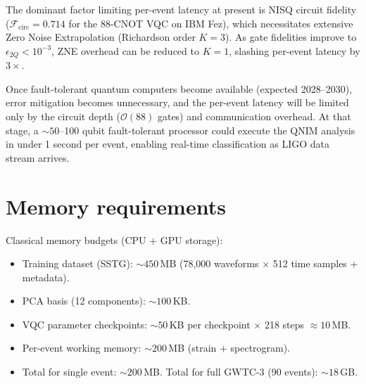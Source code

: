 \documentclass[11pt,a4paper, english]{book}
\theoremstyle{plain}
\theoremstyle{definition}
\numberwithin{equation}{chapter}
\numberwithin{figure}{chapter}
\numberwithin{table}{chapter}
\begin{document}
\begin{table}[ht]
\centering
\small
{}
\caption[Projected QNIM latencies for future hardware]{Projected latencies for QNIM pipeline at future hardware generations. Source: own elaboration.}
\label{tab:scalability-roadmap}
\normalsize
\end{table}

The dominant factor limiting per-event latency at present is NISQ circuit fidelity 
($\mathcal{F}_\mathrm{circ} = 0.714$ for the 88-CNOT VQC on IBM Fez), which 
necessitates extensive Zero Noise Extrapolation (Richardson order $K = 3$). 
As gate fidelities improve to $\epsilon_{2Q} < 10^{-3}$, ZNE overhead can be 
reduced to $K = 1$, slashing per-event latency by $3\times$.

Once fault-tolerant quantum computers become available (expected 2028--2030), 
error mitigation becomes unnecessary, and the per-event latency will be limited 
only by the circuit depth ($\mathcal{O}(88)$ gates) and communication overhead. 
At that stage, a $\sim 50$--100 qubit fault-tolerant processor could execute the 
QNIM analysis in under 1 second per event, enabling real-time classification 
as LIGO data stream arrives.

\section{Memory requirements}

Classical memory budgets (CPU + GPU storage):
\begin{itemize}
  \item Training dataset (SSTG): $\sim 450$\,MB (78,000 waveforms $\times$ 512 
        time samples + metadata).
  \item PCA basis (12 components): $\sim 100$\,KB.
  \item VQC parameter checkpoints: $\sim 50$\,KB per checkpoint $\times$ 218 steps 
        $\approx 10$\,MB.
  \item Per-event working memory: $\sim 200$\,MB (strain + spectrogram).
  \item Total for single event: $\sim 200$\,MB. Total for full GWTC-3 (90 events): 
        $\sim 18$\,GB.
\end{itemize}
\end{document}
